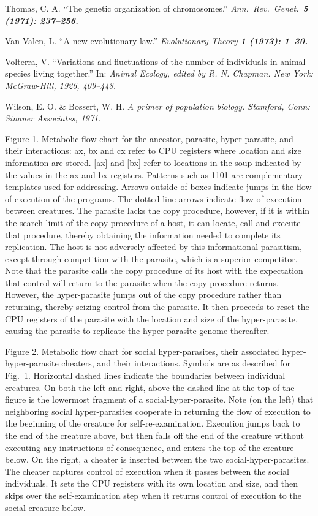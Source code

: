 Thomas, C. A.  ``The genetic organization of chromosomes.''
\it Ann.\ Rev.\ Genet.\ \bf 5 \rm (1971): 237--256.

Van Valen, L.  ``A new evolutionary law.''  \it Evolutionary Theory \bf
1 \rm (1973): 1--30.

Volterra, V.  ``Variations and fluctuations of the number of individuals
in animal species living together.''  In: \it Animal Ecology\rm , edited by
R. N. Chapman.  New York: McGraw-Hill, 1926, 409--448.

Wilson, E. O. \& Bossert, W. H.  \it A primer of population
biology\rm .  Stamford, Conn: Sinauer Associates, 1971.
\eXP

\newpage

\LP
Figure 1.  Metabolic flow chart for the ancestor, parasite, hyper-parasite,
and their interactions:  ax, bx and cx refer to CPU registers where location
and size information are stored.  [ax] and [bx] refer to locations in the
soup indicated by the values in the ax and bx registers.  Patterns such as
1101 are complementary templates used for addressing.  Arrows outside of boxes
indicate jumps in the flow of execution of the programs.  The dotted-line
arrows indicate flow of execution between creatures.  The parasite lacks the
copy procedure, however, if it is within the search limit of the copy
procedure of a host, it can locate, call and execute that procedure, thereby
obtaining the information needed to complete its replication.  The host is
not adversely affected by this informational parasitism, except through
competition with the parasite, which is a superior competitor.  Note that
the parasite calls the copy procedure of its host with the expectation that
control will return to the parasite when the copy procedure returns.  However,
the hyper-parasite jumps out of the copy procedure rather than returning,
thereby seizing control from the parasite.  It then proceeds to reset the CPU
registers of the parasite with the location and size of the hyper-parasite,
causing the parasite to replicate the hyper-parasite genome thereafter.

\newpage
\addtocounter{page}{1}

Figure 2.  Metabolic flow chart for social hyper-parasites, their associated
hyper-hyper-parasite cheaters, and their interactions.  Symbols are as
described for Fig.\ 1.  Horizontal dashed lines indicate the boundaries
between individual creatures.  On both the left and right, above the dashed
line at the top of the figure is the lowermost fragment of a
social-hyper-parasite.  Note (on the left) that neighboring social
hyper-parasites cooperate in returning the flow of execution to the beginning
of the creature for self-re-examination.  Execution jumps back to the end of
the creature above, but then falls off the end of the creature without
executing any instructions of consequence, and enters the top of the creature
below.  On the right, a cheater is inserted between the two
social-hyper-parasites.  The cheater captures control of execution when it
passes between the social individuals.  It sets the CPU registers with its own
location and size, and then skips over the self-examination step when it
returns control of execution to the social creature below.

